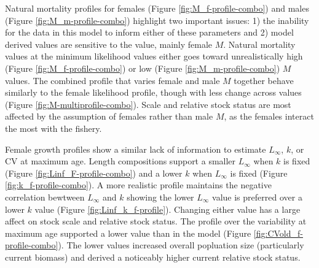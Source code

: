 \documentclass[11pt,
  english,
  a4paper,
]{article}
\begin{document}
Natural mortality profiles for females (Figure \ref{fig:M_f-profile-combo}) and males (Figure \ref{fig:M_m-profile-combo}) highlight two important issues: 1) the inability for the data in this model to inform either of these parameters and 2) model derived values are sensitive to the value, mainly female {\(M\)\leavevmode\tagmcend\tagstructend}. Natural mortality values at the minimum likelihood values either goes toward unrealistically high (Figure \ref{fig:M_f-profile-combo}) or low (Figure \ref{fig:M_m-profile-combo}) {\(M\)\leavevmode\tagmcend\tagstructend} values. The combined profile that varies female and male {\(M\)\leavevmode\tagmcend\tagstructend} together behave similarly to the female likelihood profile, though with less change across values (Figure \ref{fig:M-multiprofile-combo}). Scale and relative stock status are most affected by the assumption of females rather than male {\(M\)\leavevmode\tagmcend\tagstructend}, as the females interact the most with the fishery.

\leavevmode\tagmcend\tagstructend\par


Female growth profiles show a similar lack of information to estimate {\(L_{\infty}\)\leavevmode\tagmcend\tagstructend}, {\(k\)\leavevmode\tagmcend\tagstructend}, or CV at maximum age. Length compositions support a smaller {\(L_{\infty}\)\leavevmode\tagmcend\tagstructend} when {\(k\)\leavevmode\tagmcend\tagstructend} is fixed (Figure \ref{fig:Linf_F-profile-combo}) and a lower {\(k\)\leavevmode\tagmcend\tagstructend} when {\(L_{\infty}\)\leavevmode\tagmcend\tagstructend} is fixed (Figure \ref{fig:k_f-profile-combo}). A more realistic profile maintains the negative correlation bewtween {\(L_{\infty}\)\leavevmode\tagmcend\tagstructend} and {\(k\)\leavevmode\tagmcend\tagstructend} showing the lower {\(L_{\infty}\)\leavevmode\tagmcend\tagstructend} value is preferred over a lower {\(k\)\leavevmode\tagmcend\tagstructend} value (Figure \ref{fig:Linf_k_f-profile}). Changing either value has a large affect on stock scale and relative stock status. The profile over the variability at maximum age supported a lower value than in the model (Figure \ref{fig:CVold_f-profile-combo}). The lower values increased overall popluation size (particularly current biomass) and derived a noticeably higher current relative stock status.
\end{document}
